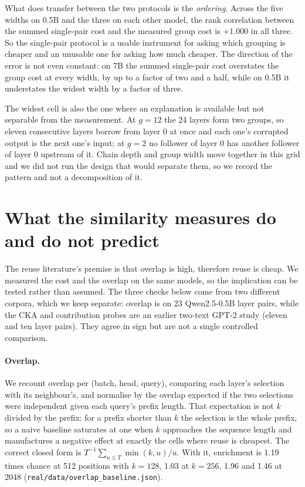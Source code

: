 \documentclass[10pt]{article}
\begin{document}
What does transfer between the two protocols is the \emph{ordering}. Across
the five widths on 0.5B and the three on each other model, the rank
correlation between the summed single-pair cost and the measured group cost
is $+1.000$ in all three. So the single-pair protocol is a usable instrument
for asking which grouping is cheaper and an unusable one for asking how much
cheaper. The direction of the error is not even constant: on 7B the summed
single-pair cost overstates the group cost at every width, by up to a factor
of two and a half, while on 0.5B it understates the widest width by a factor
of three.

The widest cell is also the one where an explanation is available but not
separable from the measurement. At $g{=}12$ the 24 layers form two groups,
so eleven consecutive layers borrow from layer 0 at once and each one's
corrupted output is the next one's input; at $g{=}2$ no follower of layer 0
has another follower of layer 0 upstream of it. Chain depth and
group width move together in this grid and we did not run the design that
would separate them, so we record the pattern and not a decomposition of
it.

\section{What the similarity measures do and do not predict}
\label{sec:whatnot}

The reuse literature's premise is that overlap is high, therefore reuse is
cheap. We measured the cost and the overlap on the same models, so the
implication can be tested rather than assumed. The three checks below come from
two different corpora, which we keep separate: overlap is on 23 Qwen2.5-0.5B
layer pairs, while the CKA and contribution probes are an earlier two-text
GPT-2 study (eleven and ten layer pairs). They agree in sign but are not a
single controlled comparison.

\paragraph{Overlap.} We recount overlap per (batch, head, query), comparing
each layer's selection with its neighbour's, and normalise by the overlap
expected if the two selections were independent given each query's prefix
length. That expectation is not $k$ divided by the prefix: for a prefix shorter
than $k$ the selection is the whole prefix, so a naive baseline saturates at
one when $k$ approaches the sequence length and manufactures a negative effect
at exactly the cells where reuse is cheapest. The correct closed form is
$T^{-1}\sum_{u \le T} \min(k, u)/u$. With it, enrichment is 1.19 times chance
at 512 positions with $k=128$, 1.03 at $k=256$, 1.96 and 1.46 at 2048
(\texttt{real/data/overlap\_baseline.json}).
\end{document}
